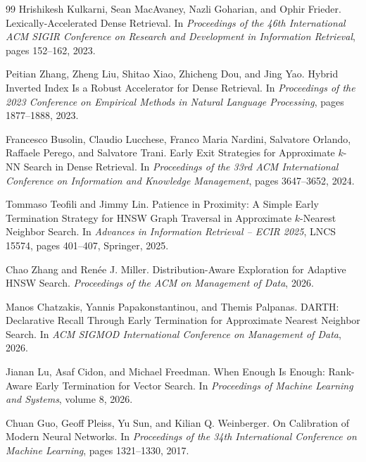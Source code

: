 \documentclass[10pt,twocolumn]{article}
\begin{document}
\begin{thebibliography}{99}
Hrishikesh Kulkarni, Sean MacAvaney, Nazli Goharian, and Ophir Frieder.
\newblock Lexically-Accelerated Dense Retrieval.
\newblock In \emph{Proceedings of the 46th International ACM SIGIR Conference on Research and Development in Information Retrieval}, pages 152--162, 2023.

Peitian Zhang, Zheng Liu, Shitao Xiao, Zhicheng Dou, and Jing Yao.
\newblock Hybrid Inverted Index Is a Robust Accelerator for Dense Retrieval.
\newblock In \emph{Proceedings of the 2023 Conference on Empirical Methods in Natural Language Processing}, pages 1877--1888, 2023.

Francesco Busolin, Claudio Lucchese, Franco Maria Nardini, Salvatore Orlando, Raffaele Perego, and Salvatore Trani.
\newblock Early Exit Strategies for Approximate $k$-NN Search in Dense Retrieval.
\newblock In \emph{Proceedings of the 33rd ACM International Conference on Information and Knowledge Management}, pages 3647--3652, 2024.

Tommaso Teofili and Jimmy Lin.
\newblock Patience in Proximity: A Simple Early Termination Strategy for HNSW Graph Traversal in Approximate $k$-Nearest Neighbor Search.
\newblock In \emph{Advances in Information Retrieval -- ECIR 2025}, LNCS 15574, pages 401--407, Springer, 2025.

Chao Zhang and Ren\'ee J. Miller.
\newblock Distribution-Aware Exploration for Adaptive HNSW Search.
\newblock \emph{Proceedings of the ACM on Management of Data}, 2026.

Manos Chatzakis, Yannis Papakonstantinou, and Themis Palpanas.
\newblock DARTH: Declarative Recall Through Early Termination for Approximate Nearest Neighbor Search.
\newblock In \emph{ACM SIGMOD International Conference on Management of Data}, 2026.

Jianan Lu, Asaf Cidon, and Michael Freedman.
\newblock When Enough Is Enough: Rank-Aware Early Termination for Vector Search.
\newblock In \emph{Proceedings of Machine Learning and Systems}, volume 8, 2026.

Chuan Guo, Geoff Pleiss, Yu Sun, and Kilian Q. Weinberger.
\newblock On Calibration of Modern Neural Networks.
\newblock In \emph{Proceedings of the 34th International Conference on Machine Learning}, pages 1321--1330, 2017.

\end{thebibliography}
\end{document}
